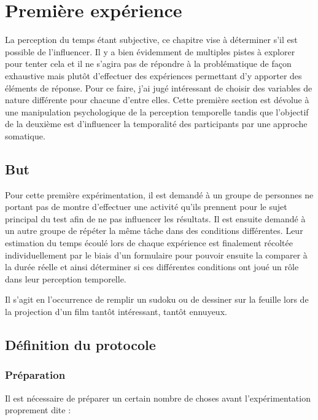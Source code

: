 \documentclass[12pt,fleqn,oneside,french,openany]{book} %
\begin{document}
\section{Première expérience} \label{sec:exp1}
La perception du temps étant subjective, ce chapitre vise à déterminer s'il est possible de l'influencer. Il y a bien évidemment de multiples pistes à explorer pour tenter cela et il ne s'agira pas de répondre à la problématique de façon exhaustive mais plutôt d'effectuer des expériences permettant d'y apporter des éléments de réponse. Pour ce faire, j'ai jugé intéressant de choisir des variables de nature différente pour chacune d'entre elles. Cette première section est dévolue à une manipulation psychologique de la perception temporelle tandis que l'objectif de la deuxième est d'influencer la temporalité des participants par une approche somatique.

\subsection{But} \label{ssec:but1}
Pour cette première expérimentation, il est demandé à un groupe de personnes ne portant pas de montre d'effectuer une activité qu'ils prennent pour le sujet principal du test afin de ne pas influencer les résultats. Il est ensuite demandé à un autre groupe de répéter la même tâche dans des conditions différentes. Leur estimation du temps écoulé lors de chaque expérience est finalement récoltée individuellement par le biais d'un formulaire pour pouvoir ensuite la comparer à la durée réelle et ainsi déterminer si ces différentes conditions ont joué un rôle dans leur perception temporelle.

Il s'agit en l'occurrence de remplir un sudoku ou de dessiner sur la feuille lors de la projection d'un film tantôt intéressant, tantôt ennuyeux.


\subsection{Définition du protocole} \label{ssec:defProto1}

\subsubsection{Préparation} \label{sssec:preparation1}
Il est nécessaire de préparer un certain nombre de choses avant l'expérimentation proprement dite :
\end{document}
